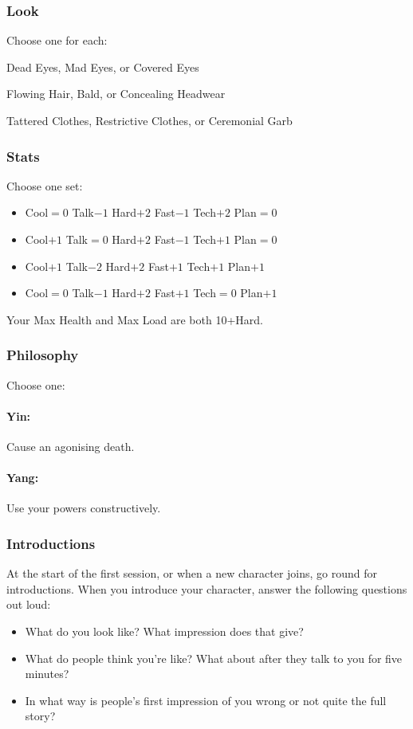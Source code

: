 \subsubsection{Look}
Choose one for each:

Dead Eyes, Mad Eyes, or Covered Eyes

Flowing Hair, Bald, or Concealing Headwear

Tattered Clothes, Restrictive Clothes, or Ceremonial Garb

\subsubsection{Stats}
Choose one set:
\begin{itemize}
\setlength\itemsep{0em}
\item Cool${=}0$ Talk$-1$ Hard$+2$ Fast$-1$ Tech$+2$ Plan${=}0$
\item Cool$+1$ Talk${=}0$ Hard$+2$ Fast$-1$ Tech$+1$ Plan${=}0$
\item Cool$+1$ Talk$-2$ Hard$+2$ Fast$+1$ Tech$+1$ Plan$+1$
\item Cool${=}0$ Talk$-1$ Hard$+2$ Fast$+1$ Tech${=}0$ Plan$+1$
\end{itemize}

Your Max Health and Max Load are both 10+Hard.

\subsubsection{Philosophy}
Choose one:
\paragraph{Yin:} Cause an agonising death.
\paragraph{Yang:} Use your powers constructively.

\subsubsection{Introductions}
At the start of the first session, or when a new character joins, go round for introductions.
When you introduce your character, answer the following questions out loud:
\begin{itemize}
\item What do you look like? What impression does that give?
\item What do people think you're like? What about after they talk to you for five minutes?
\item In what way is people's first impression of you wrong or not quite the full story?
\end{itemize}

